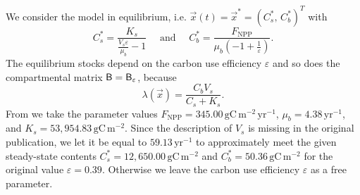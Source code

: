 \documentclass[smallextended]{svjour3}
\newcommand{\gC}{\mathrm{gC}}
\newcommand{\yr}{\mathrm{yr}}
\newcommand{\meter}{\mathrm{m}}
\newcommand{\NPP}{\ensuremath{\mathrm{NPP}}}
\begin{document}
We consider the model in equilibrium, i.e. $\vec{x}(t)=\vec{x}^\ast=(C_s^\ast,\,C_b^\ast)^T$ with
\begin{equation*}
  C_s^\ast = \frac{K_{s}}{\frac{V_{s} \varepsilon}{\mu_{b}} - 1}\quad\text{ and }\quad C_b^\ast = \frac{F_{\NPP}}{\mu_{b} \left(-1 + \frac{1}{\varepsilon}\right)}.
\end{equation*}
The equilibrium stocks depend on the carbon use efficiency $\varepsilon$ and so does the compartmental matrix $\mathsf{B}=\mathsf{B}_\varepsilon$, because
\begin{equation}\label{eqn:lambdax}
    \lambda(\vec{x}) = \frac{C_{b} V_{s}}{C_{s} + K_{s}}.
\end{equation}
From \citet{Wang2014BG} we take the parameter values $F_{\NPP} = 345.00\,\gC\,\meter^{-2}\,\yr^{-1}$, $\mu_b = 4.38\,\yr^{-1}$, and $K_s = 53,954.83\,\gC\,\meter^{-2}$.
Since the description of $V_s$ is missing in the original publication, we let it be equal to $59.13\,\yr^{-1}$ to approximately meet the given steady-state contents $C_s^\ast = 12,650.00\,\gC\,\meter^{-2}$ and $C_b^\ast = 50.36\,\gC\,\meter^{-2}$ for the original value $\varepsilon=0.39$.
Otherwise we leave the carbon use efficiency $\varepsilon$ as a free parameter.
\end{document}
